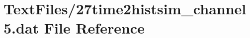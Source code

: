 \hypertarget{27time2histsim__channel5_8dat}{}\section{Text\+Files/27time2histsim\+\_\+channel5.dat File Reference}
\label{27time2histsim__channel5_8dat}
